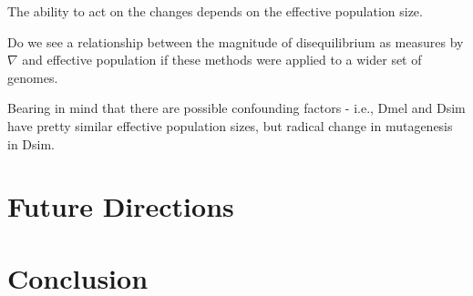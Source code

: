 The ability to act on the changes depends on the effective population size. 

Do we see a relationship between the magnitude of disequilibrium as measures by $\nabla$ and effective population if these methods were applied to a wider set of genomes. 

Bearing in mind that there are possible confounding factors - i.e., Dmel and Dsim have pretty similar effective population sizes, but radical change in mutagenesis in Dsim. 



\section{Future Directions}


\section{Conclusion}